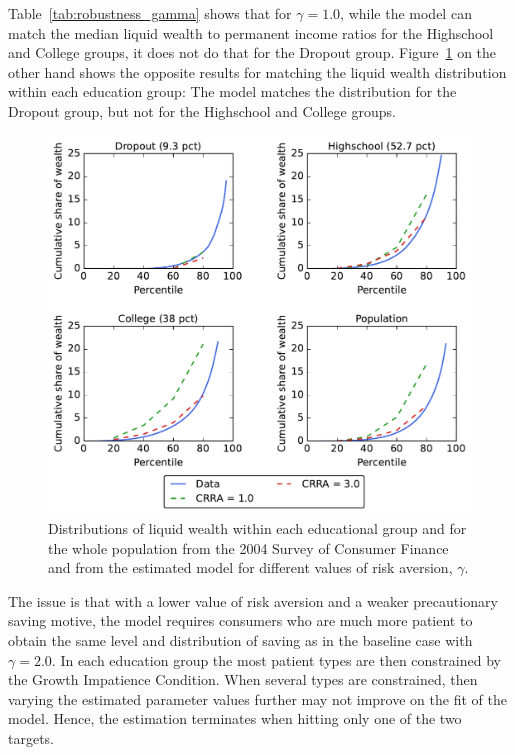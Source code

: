 \documentclass[../HAFiscal]{subfiles}
\begin{document}
Table~\ref{tab:robustness_gamma} shows that for $\gamma=1.0$, while the model can match the median liquid wealth to permanent income ratios for the Highschool and College groups, it does not do that for the Dropout group. Figure~\ref{fig:LorenzPts_robustness_CRRA} on the other hand shows the opposite results for matching the liquid wealth distribution within each education group: The model matches the distribution for the Dropout group, but not for the Highschool and College groups. 

\begin{figure}[th]
	\begin{center}
		\includegraphics[width=.9\textwidth]{../Figures/LorenzPoints_robustness_CRRA.pdf}
		\caption{Distributions of liquid wealth within each educational group and for the whole population from the 2004 Survey of Consumer Finance and from the estimated model for different values of risk aversion, $\gamma$.}
		\label{fig:LorenzPts_robustness_CRRA}
	\end{center}
\end{figure}

The issue is that with a lower value of risk aversion and a weaker precautionary saving motive, the model requires consumers who are much more patient to obtain the same level and distribution of saving as in the baseline case with $\gamma=2.0$. In each education group the most patient types are then constrained by the Growth Impatience Condition. When several types are constrained, then varying the estimated parameter values further may not improve on the fit of the model. Hence, the estimation terminates when hitting only one of the two targets. 
\end{document}
